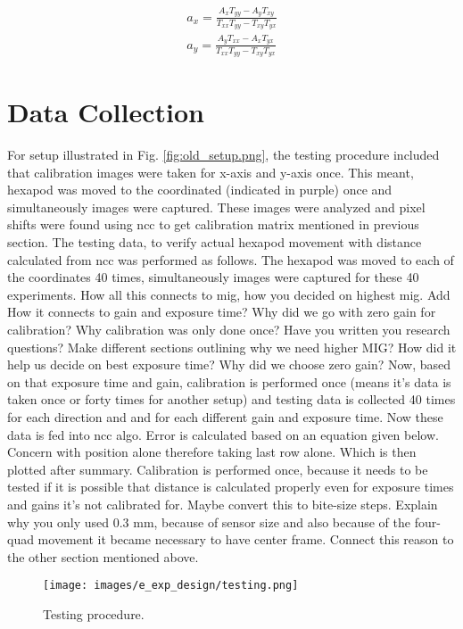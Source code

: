 \begin{equation}\label{eqn:dist_calc}
    \begin{aligned}
        a_x = \frac{A_xT_{yy} - A_yT_{xy}}{T_{xx}T_{yy} - T_{xy}T_{yx}} \\
        a_y = \frac{A_yT_{xx} - A_xT_{yx}}{T_{xx}T_{yy} - T_{xy}T_{yx}}
    \end{aligned}
\end{equation}

\section{Data Collection}\label{section:data_collection}
For setup illustrated in Fig. \ref{fig:old_setup.png}, the testing procedure included that calibration images were taken for x-axis and y-axis once. This meant, hexapod was moved to the coordinated (indicated in purple) once and simultaneously images were captured. These images were analyzed and pixel shifts were found using \gls{ncc} to get calibration matrix mentioned in previous section. The testing data, to verify actual hexapod movement with distance calculated from \gls{ncc} was performed as follows. The hexapod was moved to each of the coordinates 40 times, simultaneously images were captured for these 40 experiments. How all this connects to \gls{mig}, how you decided on highest \gls{mig}. Add How it connects to gain and exposure time? Why did we go with zero gain for calibration? Why calibration was only done once? Have you written you research questions? Make different sections outlining why we need higher MIG? How did it help us decide on best exposure time? Why did we choose zero gain? Now, based on that exposure time and gain, calibration is performed once (means it's data is taken once or forty times for another setup) and testing data is collected 40 times for each direction and and for each different gain and exposure time. Now these data is fed into ncc algo. Error is calculated based on an equation given below. Concern with position alone therefore taking last row alone. Which is then plotted after summary. Calibration is performed once, because it needs to be tested if it is possible that distance is calculated properly even for exposure times and gains it's not calibrated for. Maybe convert this to bite-size steps. Explain why you only used 0.3 mm, because of sensor size and also because of the four-quad movement it became necessary to have center frame. Connect this reason to the other section mentioned above. 
\begin{figure}[h]
    \centering
    \texttt{[image: images/e\_exp\_design/testing.png]}
    \caption{Testing procedure.}
    \label{fig:testing.png}
\end{figure}

